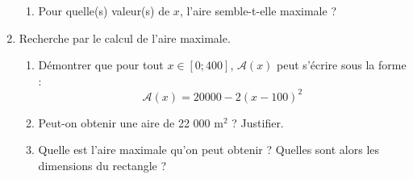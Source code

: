 \begin{prob}
\begin{enumerate}
\begin{enumerate}
	\item Pour quelle(s) valeur(s) de $x$, l'aire semble-t-elle maximale ?
\end{enumerate}
\item Recherche par le calcul de l'aire maximale.
\begin{enumerate}
	\item D\'emontrer que pour tout $x\in[0;400]$, $\mathcal{A}(x)$ peut s'\'ecrire sous la forme : \[\mathcal{A}(x)=20 000 - 2(x-100)^2 \]
	\item Peut-on obtenir une aire de 22 000 m$^2$ ? Justifier.
	\item Quelle est l'aire maximale qu'on peut obtenir ? Quelles sont alors les dimensions du rectangle ?
\end{enumerate}
\end{enumerate}
\end{prob}











